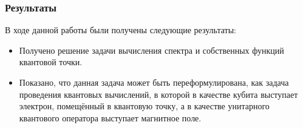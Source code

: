\documentclass{beamer}
\begin{document}
\begin{frame}
 \frametitle{Результаты}
В ходе данной работы были получены следующие результаты:
\begin{itemize}
  \item Получено решение задачи вычисления спектра и собственных функций квантовой точки.
  \item Показано, что данная задача может быть переформулирована, как задача проведения квантовых вычислений, в которой в качестве кубита выступает электрон, помещённый в квантовую точку, а в качестве унитарного квантового оператора выступает магнитное поле.
 \end{itemize}
\end{frame}
\end{document}
